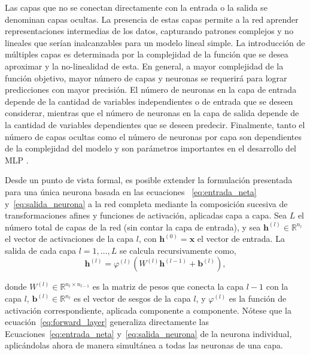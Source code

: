 Las capas que no se conectan directamente con la entrada o la salida se denominan capas ocultas. La presencia de estas capas permite a la red aprender representaciones intermedias de los datos, capturando patrones 
complejos y no lineales que serían inalcanzables para un modelo lineal simple. La introducción de múltiples capas es determinada por la complejidad de la función que se desea aproximar y la no-linealidad de esta. 
En general, a mayor complejidad de la función objetivo, mayor número de capas y neuronas se requerirá para lograr predicciones con mayor precisión. El número de neuronas
en la capa de entrada depende de la cantidad de variables independientes o de entrada que se deseen considerar, mientras que el número de neuronas en la capa de salida depende de la cantidad de variables dependientes que se deseen predecir.
Finalmente, tanto el número de capas ocultas como el número de neuronas por capa son dependientes de la complejidad del modelo y son parámetros importantes en el desarrollo del MLP \cite{park2025artificial}.

Desde un punto de vista formal, es posible extender la formulación presentada para una única neurona basada en las ecuaciones ~\eqref{eq:entrada_neta} y~\eqref{eq:salida_neurona} a la red completa mediante la composición sucesiva de 
transformaciones afines y funciones de activación, aplicadas capa a capa. Sea $L$ el número total de capas de la red (sin contar la capa de entrada), y sea $\mathbf{h}^{(l)} \in \mathbb{R}^{n_l}$ el vector de 
activaciones de la capa $l$, con $\mathbf{h}^{(0)} = \mathbf{x}$ el vector de entrada. La salida de cada capa $l = 1, \dots, L$ se calcula recursivamente como,
\begin{equation}
    \mathbf{h}^{(l)} = \varphi^{(l)}\!\left(W^{(l)} \mathbf{h}^{(l-1)} + \mathbf{b}^{(l)}\right),
    \label{eq:forward_layer}
\end{equation}

\noindent donde $W^{(l)} \in \mathbb{R}^{n_l \times n_{l-1}}$ es la matriz de pesos que conecta la capa $l-1$ con la capa $l$, $\mathbf{b}^{(l)} \in \mathbb{R}^{n_l}$ es el vector de sesgos de la capa $l$, y $\varphi^{(l)}$ es 
la función de activación correspondiente, aplicada componente a componente. Nótese que la ecuación~\eqref{eq:forward_layer} generaliza directamente las Ecuaciones~\eqref{eq:entrada_neta} y~\eqref{eq:salida_neurona} de 
la neurona individual, aplicándolas ahora de manera simultánea a todas las neuronas de una capa.


